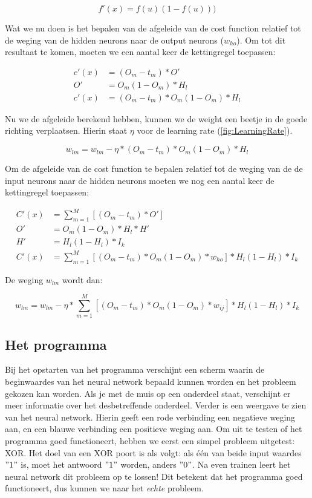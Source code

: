 $$ f'(x) = f(u)(1-f(u))) $$

Wat we nu doen is het bepalen van de afgeleide van de cost function relatief tot de weging van de hidden neurons naar de output neurons ($w_{ho}$). Om tot dit resultaat te komen, moeten we een aantal keer de kettingregel toepassen:

\begin{align*}
	c'(x) &= (O_{m}-t_{m}) * O' \\
	O' &= O_{m}(1-O_{m}) * H_{l} \\
	c'(x) &= (O_{m}-t_{m}) * O_{m}(1-O_{m})*H_{l}
\end{align*}

Nu we de afgeleide berekend hebben, kunnen we de weight een beetje in de goede richting verplaatsen. Hierin staat $\eta$ voor de learning rate (\ref{fig:LearningRate}).

$$ w_{lm} = w_{lm} - \eta *(O_{m}-t_{m}) * O_{m}(1-O_{m})*H_{l} $$

Om de afgeleide van de cost function te bepalen relatief tot de weging van de de input neurons naar de hidden neurons moeten we nog een aantal keer de kettingregel toepassen:

\begin{align*}
	C'(x) &= \sum_{m=1}^{M}[(O_{m}-t_{m}) * O'] \\
	O' &= O_{m}(1-O_{m}) * H_{l} * H' \\
	H' &= H_{l}(1-H_{l})*I_{k}\\
	C'(x) &= \sum_{m=1}^{M}[(O_{m}-t_{m}) * O_{m}(1-O_{m})*w_{ho}]*H_{l}(1-H_{l})*I_{k}
\end{align*}



De weging $w_{lm}$ wordt dan:

$$ w_{lm} = w_{lm} - \eta *\sum_{m=1}^{M}[(O_{m}-t_{m}) * O_{m}(1-O_{m})*w_{ij}]*H_{l}(1-H_{l})*I_{k} $$

\subsection{Het programma}
Bij het opstarten van het programma verschijnt een scherm waarin de beginwaardes van het neural network bepaald kunnen worden en het probleem gekozen kan worden. Als je met de muis op een onderdeel staat, verschijnt er meer informatie over het desbetreffende onderdeel. Verder is een weergave te zien van het neural network. Hierin geeft een rode verbinding een negatieve weging aan, en een blauwe verbinding een positieve weging aan.
Om uit te testen of het programma goed functioneert, hebben we eerst een simpel probleem uitgetest: XOR. Het doel van een XOR poort is als volgt: als \'e\'en van beide input waardes $"1"$ is, moet het antwoord $"1"$ worden, anders $"0"$. Na even trainen leert het neural network dit probleem op te lossen! Dit betekent dat het programma goed functioneert, dus kunnen we naar het \textit{echte} probleem.

